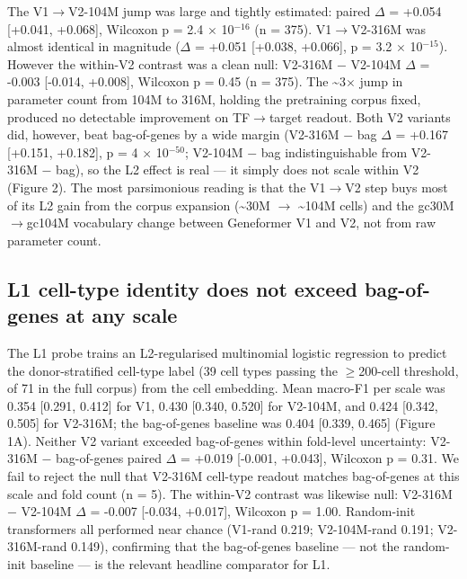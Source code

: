 \documentclass[
  11pt,
]{article}
\begin{document}
The V1$\to$V2-104M jump was large and tightly estimated: paired $\Delta$ = +0.054
{[}+0.041, +0.068{]}, Wilcoxon p = 2.4 $\times$ 10$^{-16}$ (n = 375). V1$\to$V2-316M was
almost identical in magnitude ($\Delta$ = +0.051 {[}+0.038, +0.066{]}, p = 3.2
$\times$ 10$^{-15}$). However the within-V2 contrast was a clean null: V2-316M $-$
V2-104M $\Delta$ = -0.003 {[}-0.014, +0.008{]}, Wilcoxon p = 0.45 (n = 375).
The \textasciitilde3$\times$ jump in parameter count from 104M to 316M, holding
the pretraining corpus fixed, produced no detectable improvement on
TF$\to$target readout. Both V2 variants did, however, beat bag-of-genes by a
wide margin (V2-316M $-$ bag $\Delta$ = +0.167 {[}+0.151, +0.182{]}, p = 4 $\times$
10$^{-50}$; V2-104M $-$ bag indistinguishable from V2-316M $-$ bag), so the L2
effect is real --- it simply does not scale within V2 (Figure 2). The
most parsimonious reading is that the V1$\to$V2 step buys most of its L2
gain from the corpus expansion (\textasciitilde30M $\to$ \textasciitilde104M
cells) and the gc30M$\to$gc104M vocabulary change between Geneformer V1 and
V2, not from raw parameter count.

\subsection{L1 cell-type identity does not exceed bag-of-genes at
any
scale}\label{l1-cell-type-identity-does-not-exceed-bag-of-genes-at-any-scale}

The L1 probe trains an L2-regularised multinomial logistic regression to
predict the donor-stratified cell-type label (39 cell types passing the
$\geq$200-cell threshold, of 71 in the full corpus) from the cell embedding.
Mean macro-F1 per scale was 0.354 {[}0.291, 0.412{]} for V1, 0.430
{[}0.340, 0.520{]} for V2-104M, and 0.424 {[}0.342, 0.505{]} for
V2-316M; the bag-of-genes baseline was 0.404 {[}0.339, 0.465{]} (Figure
1A). Neither V2 variant exceeded bag-of-genes within fold-level
uncertainty: V2-316M $-$ bag-of-genes paired $\Delta$ = +0.019 {[}-0.001,
+0.043{]}, Wilcoxon p = 0.31. We fail to reject the null that V2-316M
cell-type readout matches bag-of-genes at this scale and fold count (n =
5). The within-V2 contrast was likewise null: V2-316M $-$ V2-104M $\Delta$ =
-0.007 {[}-0.034, +0.017{]}, Wilcoxon p = 1.00. Random-init transformers
all performed near chance (V1-rand 0.219; V2-104M-rand 0.191;
V2-316M-rand 0.149), confirming that the bag-of-genes baseline --- not
the random-init baseline --- is the relevant headline comparator for L1.
\end{document}
